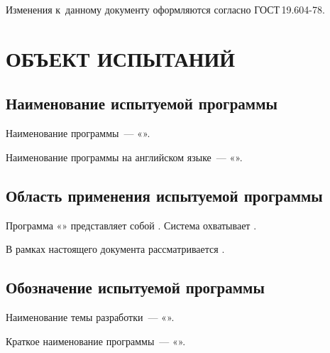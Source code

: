 \documentclass[12pt,a4paper]{extarticle}
\begin{document}
Изменения к~данному документу оформляются согласно ГОСТ\,19.604-78\cite{gost19604}.

\clearpage

\hypersetup{linkcolor=black}
\tableofcontents
\hypersetup{linkcolor=blue}
\thispagestyle{fancy}
\clearpage

\section{ОБЪЕКТ ИСПЫТАНИЙ}

\subsection{Наименование испытуемой программы}

Наименование программы~--- «\projectname».

Наименование программы на английском языке~--- «\hseProjectNameEn».

\subsection{Область применения испытуемой программы}


Программа «\projectname» представляет собой . Система охватывает .

В рамках настоящего документа рассматривается .

\subsection{Обозначение испытуемой программы}

Наименование темы разработки~--- «\projectname».

Краткое наименование программы~--- «\hseProjectNameShort».
\end{document}
